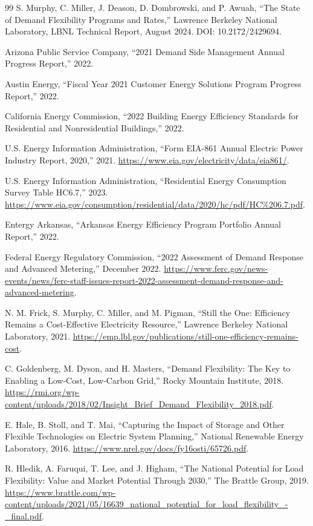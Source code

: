 \documentclass[11pt]{article}
\begin{document}
\begin{thebibliography}{99}
S. Murphy, C. Miller, J. Deason, D. Dombrowski, and P. Awuah, ``The State of Demand Flexibility Programs and Rates,'' Lawrence Berkeley National Laboratory, LBNL Technical Report, August 2024. DOI: 10.2172/2429694.

Arizona Public Service Company, ``2021 Demand Side Management Annual Progress Report,'' 2022.

Austin Energy, ``Fiscal Year 2021 Customer Energy Solutions Program Progress Report,'' 2022.

California Energy Commission, ``2022 Building Energy Efficiency Standards for Residential and Nonresidential Buildings,'' 2022.

U.S. Energy Information Administration, ``Form EIA-861 Annual Electric Power Industry Report, 2020,'' 2021. \url{https://www.eia.gov/electricity/data/eia861/}.

U.S. Energy Information Administration, ``Residential Energy Consumption Survey Table HC6.7,'' 2023. \url{https://www.eia.gov/consumption/residential/data/2020/hc/pdf/HC\%206.7.pdf}.

Entergy Arkansas, ``Arkansas Energy Efficiency Program Portfolio Annual Report,'' 2022.

Federal Energy Regulatory Commission, ``2022 Assessment of Demand Response and Advanced Metering,'' December 2022. \url{https://www.ferc.gov/news-events/news/ferc-staff-issues-report-2022-assessment-demand-response-and-advanced-metering}.

N. M. Frick, S. Murphy, C. Miller, and M. Pigman, ``Still the One: Efficiency Remains a Cost-Effective Electricity Resource,'' Lawrence Berkeley National Laboratory, 2021. \url{https://emp.lbl.gov/publications/still-one-efficiency-remains-cost}.

C. Goldenberg, M. Dyson, and H. Masters, ``Demand Flexibility: The Key to Enabling a Low-Cost, Low-Carbon Grid,'' Rocky Mountain Institute, 2018. \url{https://rmi.org/wp-content/uploads/2018/02/Insight_Brief_Demand_Flexibility_2018.pdf}.

E. Hale, B. Stoll, and T. Mai, ``Capturing the Impact of Storage and Other Flexible Technologies on Electric System Planning,'' National Renewable Energy Laboratory, 2016. \url{https://www.nrel.gov/docs/fy16osti/65726.pdf}.

R. Hledik, A. Faruqui, T. Lee, and J. Higham, ``The National Potential for Load Flexibility: Value and Market Potential Through 2030,'' The Brattle Group, 2019. \url{https://www.brattle.com/wp-content/uploads/2021/05/16639_national_potential_for_load_flexibility_-_final.pdf}.


\end{thebibliography}
\end{document}
